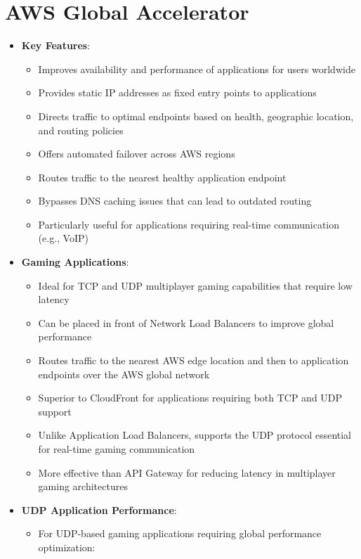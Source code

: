 \documentclass[11pt,a4paper]{report}
\begin{document}
\section{AWS Global Accelerator}

\begin{itemize}
  \item \textbf{Key Features}:
\begin{itemize}
  \item Improves availability and performance of applications for users worldwide
  \item Provides static IP addresses as fixed entry points to applications
  \item Directs traffic to optimal endpoints based on health, geographic location, and routing policies
  \item Offers automated failover across AWS regions
  \item Routes traffic to the nearest healthy application endpoint
  \item Bypasses DNS caching issues that can lead to outdated routing
  \item Particularly useful for applications requiring real-time communication (e.g., VoIP)
\end{itemize}
  \item \textbf{Gaming Applications}:
\begin{itemize}
  \item Ideal for TCP and UDP multiplayer gaming capabilities that require low latency
  \item Can be placed in front of Network Load Balancers to improve global performance
  \item Routes traffic to the nearest AWS edge location and then to application endpoints over the AWS global network
  \item Superior to CloudFront for applications requiring both TCP and UDP support
  \item Unlike Application Load Balancers, supports the UDP protocol essential for real-time gaming communication
  \item More effective than API Gateway for reducing latency in multiplayer gaming architectures
\end{itemize}
  \item \textbf{UDP Application Performance}:
\begin{itemize}
  \item For UDP-based gaming applications requiring global performance optimization:
\begin{itemize}

\end{itemize}
\end{itemize}
\end{itemize}
\end{document}

